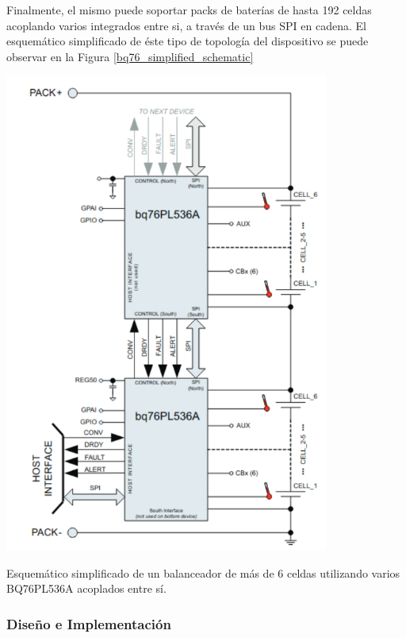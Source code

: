 \documentclass[10pt,a4paper]{article}
\begin{document}
\begin{itemize}
\begin{minipage}{0.5\textwidth}
Finalmente, el mismo puede soportar packs de bater\'ias de hasta 192 celdas
acoplando varios integrados entre si, a trav\'es de un bus SPI en cadena. El
esquem\'atico simplificado de \'este tipo de topolog\'ia del dispositivo se
puede observar en la Figura \ref{bq76_simplified_schematic}

\end{minipage}
\begin{minipage}{0.5\textwidth}
    \begin{center}
        \includegraphics[width=0.8\textwidth]{bq76_simplified_schematic.png}
        \caption{Esquem\'atico simplificado de un balanceador de m\'as de 6
        celdas utilizando varios BQ76PL536A acoplados entre s\'i.}
        \label{bq76_simplified_schematic}
    \end{center}
\end{minipage}

\subsubsection{Diseño e Implementación}


\end{itemize}
\end{document}

